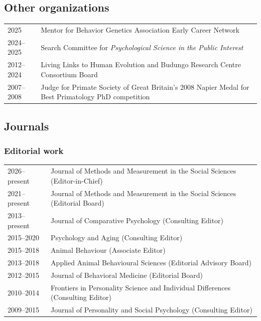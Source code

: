 \documentclass[11pt]{article}
\begin{document}
\subsection*{Other organizations}
\begin{tabular}{p{3cm}p{12cm}}
  2025 & Mentor for Behavior Genetics Association Early Career Network \\
  2024--2025 & Search Committee for \textit{Psychological Science in the
               Public Interest} \\
  2012--2024 & Living Links to Human Evolution and Budungo Research
               Centre Consortium Board \\
  2007--2008 & Judge for Primate Society of Great Britain's 2008 Napier Medal
               for Best Primatology PhD competition
\end{tabular}

\subsection*{Journals}

\subsubsection*{Editorial work}

\begin{tabular}{p{3cm}p{12cm}}
  2026--present & Journal of Methods and Measurement in the Social
                  Sciences (Editor-in-Chief) \\
  2021--present & Journal of Methods and Measurement in the Social
                  Sciences (Editorial Board) \\
  2013--present & Journal of Comparative Psychology (Consulting Editor) \\
  2015--2020 & Psychology and Aging (Consulting Editor) \\
  2015--2018 & Animal Behaviour (Associate Editor) \\
  2013--2018 & Applied Animal Behavioural Sciences (Editorial Advisory Board) \\
  2012--2015 & Journal of Behavioral Medicine (Editorial Board) \\
  2010--2014 & Frontiers in Personality Science and Individual
               Differences (Consulting Editor) \\
  2009--2015 & Journal of Personality and Social Psychology (Consulting Editor)
\end{tabular}
\end{document}
